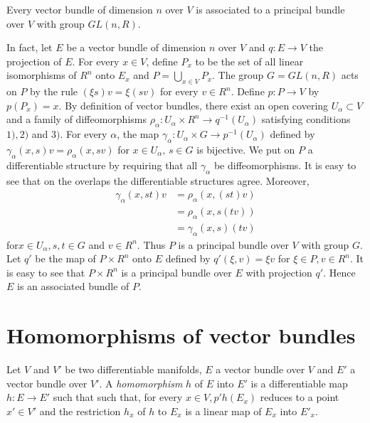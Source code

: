 \setcounter{proposition}{0}
\begin{proposition}\label{chap5:sec1:prop1}%
  Every vector bundle of dimension $n$ over $V$ is associated to a
  principal bundle over $V$ with group $GL(n, R)$. 
\end{proposition}

In fact, let $E$ be a vector bundle of dimension $n$ over $V$ and $q :
E \to V$ the projection of $E$. For every $x \in V$, define $P_x$ to
be the set of all linear isomorphisms of $R^n$ onto $E_x$ and $P =
\bigcup \limits_{x \in V} P_x$. The group $G = GL(n, R)$ acts on $P$
by the rule $(\xi s) v = \xi(sv)$ for  every $v \in R^n$. Define $p :
P \to V$ by $p(P_x)=x$. By definition of vector bundles, there exist
an open covering $U_{\alpha} \subset V$ and a family of
diffeomorphisms $\rho _{\alpha} : U_{\alpha} \times R^n \to q^{-1}
(U_{\alpha})$ satisfying conditions $1), 2)$ and $3)$. For every
$\alpha$, the map $\gamma_{\alpha}: U_{\alpha} \times G \to p^{-1}
(U_{\alpha})$ defined by $\gamma _{\alpha}(x, s) v = \rho _{\alpha}
(x, sv)$ for $x \in U_{\alpha}, \,s \in G$ is bijective. 
We put on $P$ a differentiable structure by requiring that all
$\gamma_{\alpha}$ be diffeomorphisms. It is easy to see that on the
overlaps the differentiable structures agree. Moreover, 
\begin{align*}
  \gamma_{\alpha}(x,st)v & = \rho_{\alpha} (x, (st) v)\\
  &=\rho_{\alpha} (x, s (tv) )\\  
  & = \gamma_{\alpha}(x,s) (tv)
\end{align*}
for\pageoriginale $x \in U_{\alpha}, s, t \in G$ and $v \in R^n$. Thus $P$ is a
principal bundle over $V$ with group $G$. Let $q'$ be the map of $P
\times R^n$ onto $E$ defined by $q'(\xi, v) = \xi v$ for $\xi \in P, v
\in R^n$. It is easy to see that $P \times R^n$ is a principal bundle
over $E$ with projection $q'$. Hence $E$ is an associated bundle of
$P$. 

\section{Homomorphisms of vector bundles}\label{chap5:sec2}%

\setcounter{defn}{0}
\begin{defn}\label{chap5:sec2:def1}%
  Let $V$ and $V'$ be two differentiable manifolds, $E$ a vector
  bundle  over $V$ and $E'$ a vector bundle over $V'$. A \textit{
    homomorphism } $h$ of $E$ into $E'$ is a differentiable map $h : E
  \to E'$ such that such that, for every $x \in V, p' h (E_x)$ reduces
  to a point $x' \in V'$ and the restriction $h_x$ of $h$ to $E_x$ is a
  linear map of $E_x$ into $E'_x$. 
\end{defn}

